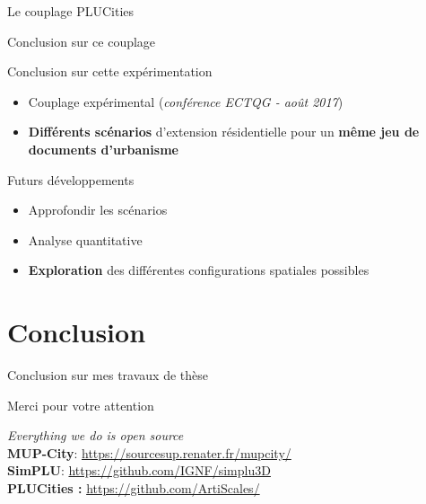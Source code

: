 \documentclass[xcolor=table]{beamer}
\newcommand\FontPetit{\fontsize{8}{6}\selectfont}
\begin{document}
\begin{frame}{Le couplage PLUCities}
	\FontPetit{}
\end{frame}


\begin{frame}{Conclusion sur ce couplage}
	\begin{block}{Conclusion sur cette expérimentation}		
		\begin{itemize}
			\item Couplage expérimental (\textit{conférence ECTQG - août 2017})
			\item \textbf{Différents scénarios} d'extension résidentielle pour un \textbf{même jeu de documents d'urbanisme}
		\end{itemize}
	\end{block}
	\begin{block}{Futurs développements}		
		\begin{itemize}
			\item Approfondir les scénarios
			\item Analyse quantitative
			\item \textbf{Exploration} des différentes configurations spatiales possibles
		\end{itemize}
	\end{block}
\end{frame}




\section{Conclusion}




\begin{frame}{Conclusion sur mes travaux de thèse}
		
\end{frame}

\begin{frame}[standout]
	\centering
	\begin{block}{}	
		\centering	
		Merci pour votre attention
	\end{block}
	\begin{block}{}
		\centering
		\textit{Everything we do is open source}\\
		\large
		\textbf{MUP-City}: \url{https://sourcesup.renater.fr/mupcity/} \\
		\textbf{SimPLU}: \url{https://github.com/IGNF/simplu3D}\\
		\textbf{PLUCities :} \url{https://github.com/ArtiScales/}  
	\end{block}
\end{frame}
\end{document}
